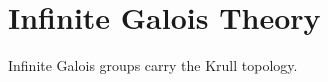 \section{Infinite Galois Theory}
\label{sec:infinite-galois}

Infinite Galois groups carry the Krull topology.

